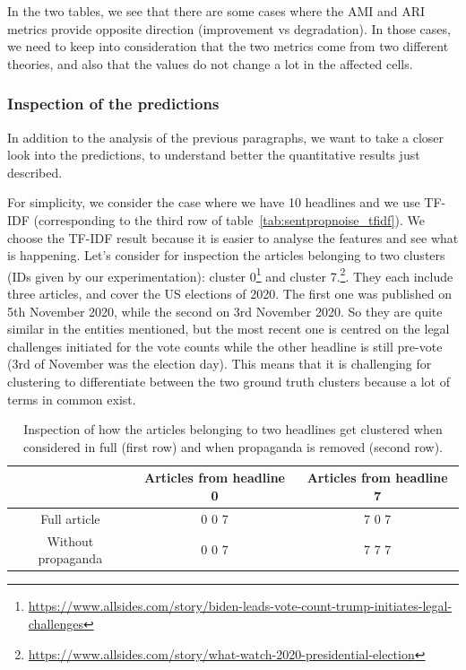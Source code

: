 In the two tables, we see that there are some cases where the AMI and ARI metrics provide opposite direction (improvement vs degradation). In those cases, we need to keep into consideration that the two metrics come from two different theories, and also that the values do not change a lot in the affected cells.

\subsubsection{Inspection of the predictions}

In addition to the analysis of the previous paragraphs, we want to take a closer look into the predictions, to understand better the quantitative results just described.

For simplicity, we consider the case where we have 10 headlines and we use TF-IDF (corresponding to the third row of table~\ref{tab:sentpropnoise_tfidf}). We choose the TF-IDF result because it is easier to analyse the features and see what is happening.
Let’s consider for inspection the articles belonging to two clusters (IDs given by our experimentation): cluster 0\footnote{\url{https://www.allsides.com/story/biden-leads-vote-count-trump-initiates-legal-challenges}} and cluster 7.\footnote{\url{https://www.allsides.com/story/what-watch-2020-presidential-election}}. They each include three articles, and cover the US elections of 2020. The first one was published on 5th November 2020, while the second on 3rd November 2020. So they are quite similar in the entities mentioned, but the most recent one is centred on the legal challenges initiated for the vote counts while the other headline is still pre-vote (3rd of November was the election day). This means that it is challenging for clustering to differentiate between the two ground truth clusters because a lot of terms in common exist.

\begin{table}[!htbp]
    \centering
    \begin{tabular}{c|c|c}
         & Articles from headline 0 & Articles from headline 7 \\
         \hline
        Full article & 0 0 7 & 7 0 7 \\
        Without propaganda & 0 0 7 & 7 7 7
    \end{tabular}
    \caption{Inspection of how the articles belonging to two headlines get clustered when considered in full (first row) and when propaganda is removed (second row).}
    \label{tab:sentpropnoise_inspection}
\end{table}

